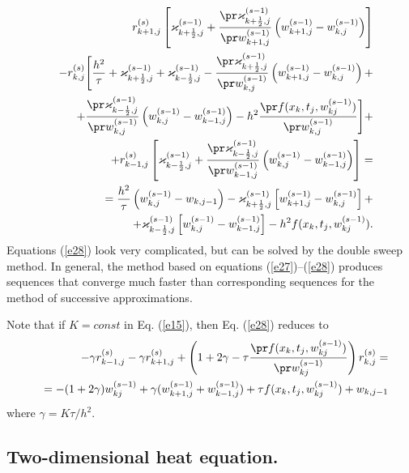 \begin{eqnarray}
&&r_{k+1,j}^{(s)}\left[\varkappa_{k+\frac{1}{2},j}^{(s-1)}+
\frac{\pr \varkappa_{k+\frac{1}{2},j}^{(s-1)}}{\pr w_{k+1,j}^{(s-1)}}
\left(w_{k+1,j}^{(s-1)}-w_{k,j}^{(s-1)}\right)\right] \nonumber \\
&&-r_{k,j}^{(s)}\Biggl[\frac{h^2}{\tau}+\varkappa_{k+\frac{1}{2},j}^{(s-1)}
+\varkappa_{k-\frac{1}{2},j}^{(s-1)}-
\frac{\pr \varkappa_{k+\frac{1}{2},j}^{(s-1)}}{\pr w_{k,j}^{(s-1)}}
\left(w_{k+1,j}^{(s-1)}-w_{k,j}^{(s-1)}\right)+  \nonumber \\
&&+
\frac{\pr \varkappa_{k-\frac{1}{2},j}^{(s-1)}}{\pr w_{k,j}^{(s-1)}}
\left(w_{k,j}^{(s-1)}-w_{k-1,j}^{(s-1)}\right)
-h^2\frac{\pr f(x_{k},t_{j},w^{(s-1)}_{kj})}{\pr w_{k,j}^{(s-1)}}
\Biggr]+ \nonumber \\
&&+
r_{k-1,j}^{(s)}\left[\varkappa_{k-\frac{1}{2},j}^{(s-1)}+
\frac{\pr \varkappa_{k-\frac{1}{2},j}^{(s-1)}}{\pr w_{k-1,j}^{(s-1)}}
\left(w_{k,j}^{(s-1)}-w_{k-1,j}^{(s-1)}\right)\right]= \nonumber \\
&&=
\frac{h^2}{\tau}\left(w_{k,j}^{(s-1)}-w_{k,j-1}\right)-
\varkappa_{k+\frac{1}{2},j}^{(s-1)}\left[w_{k+1,j}^{(s-1)}-w_{k,j}^{(s-1)}\right]+  \nonumber \\
&&\quad\quad +
\varkappa_{k-\frac{1}{2},j}^{(s-1)}\left[w_{k,j}^{(s-1)}-w_{k-1,j}^{(s-1)}\right]
-h^2f(x_{k},t_{j},w_{kj}^{(s-1)}).\label{e28}
\end{eqnarray}
Equations (\ref{e28}) look very complicated, but can be solved by the double sweep method.
In general, the method based on equations (\ref{e27})--(\ref{e28}) produces sequences
that converge much faster than corresponding sequences for the method
of successive approximations.


  
 
Note that if $K=const$ in Eq. (\ref{e15}), then Eq. (\ref{e28}) reduces to
\begin{eqnarray}\label{e29}
&&-\gamma r_{k-1,j}^{(s)}
-\gamma r_{k+1,j}^{(s)}+\left(1+2\gamma - \tau \frac{\pr f(x_{k},t_{j},w_{kj}^{(s-1)})}{\pr w_{kj}^{(s-1)}}\right)r_{k,j}^{(s)}=  \\
&&=-(1+2\gamma)w_{kj}^{(s-1)}+\gamma(w_{k+1,j}^{(s-1)}+w_{k-1,j}^{(s-1)})+\tau f(x_{k},t_{j},w_{kj}^{(s-1)})+w_{k,j-1}  \nonumber 
\end{eqnarray}
where $\gamma=K\tau/h^2$.



\subsection{Two-dimensional heat equation.}

